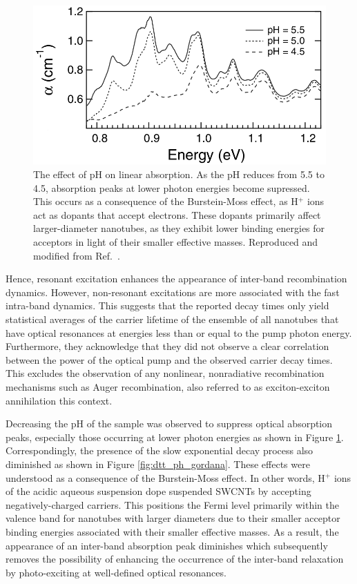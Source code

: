 \begin{figure}[ht]
	\centering
	\includegraphics[scale=1.5]{images/chapter_prior_works/ph_effect_gordana_revised}
	\caption{The effect of pH on linear absorption. As the pH reduces from 5.5 to 4.5, absorption peaks at lower photon energies become supressed. This occurs as a consequence of the Burstein-Moss effect, as H$^+$ ions act as dopants that accept electrons. These dopants primarily affect larger-diameter nanotubes, as they exhibit lower binding energies for acceptors in light of their smaller effective masses. Reproduced and modified from Ref.\ \cite{ostojic2004interband}.}
	\label{fig:ph_abs_gordana}
\end{figure}

Hence, resonant excitation enhances the appearance of inter-band recombination dynamics. However, non-resonant excitations are more associated with the fast intra-band dynamics. This suggests that the reported decay times only yield statistical averages of the carrier lifetime of the ensemble of all nanotubes that have optical resonances at energies less than or equal to the pump photon energy. Furthermore, they acknowledge that they did not observe a clear correlation between the power of the optical pump and the observed carrier decay times. This excludes the observation of any nonlinear, nonradiative recombination mechanisms such as Auger recombination, also referred to as exciton-exciton annihilation this context.





Decreasing the pH of the sample was observed to suppress optical absorption peaks, especially those occurring at lower photon energies as shown in Figure \ref{fig:ph_abs_gordana}. Correspondingly, the presence of the slow exponential decay process also diminished as shown in Figure \ref{fig:dtt_ph_gordana}. These effects were understood as a consequence of the Burstein-Moss effect. In other words, H$^+$ ions of the acidic aqueous suspension dope suspended SWCNTs by accepting negatively-charged carriers. This positions the Fermi level primarily within the valence band for nanotubes with larger diameters due to their smaller acceptor binding energies associated with their smaller effective masses.  As a result, the appearance of an inter-band absorption peak diminishes which subsequently removes the possibility of enhancing the occurrence of the inter-band relaxation by photo-exciting at well-defined optical resonances.


